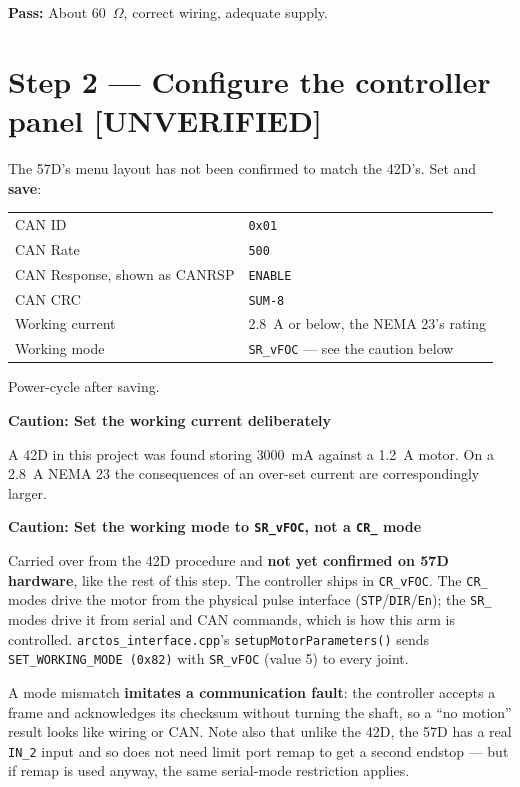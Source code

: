 \documentclass[11pt,letterpaper]{article}
\newenvironment{caution}[1]{%
    \par\addvspace{8pt}%
    \noindent{\color{cautionred}\rule{\linewidth}{0.8pt}}\par\vspace{2pt}
    \noindent\textbf{\color{cautionred}Caution: #1}\par\vspace{2pt}
}{%
    \par\vspace{2pt}\noindent{\color{cautionred}\rule{\linewidth}{0.4pt}}%
    \par\addvspace{8pt}%
}
\newcommand{\unverified}{{\color{unverifiedorange}\textbf{[UNVERIFIED]}}}
\newcommand{\passif}[1]{\par\vspace{2pt}\noindent\textbf{\color{okgreen}Pass:} #1\par\vspace{4pt}}
\begin{document}
\passif{About 60~$\Omega$, correct wiring, adequate supply.}

\section*{Step 2 --- Configure the controller panel \unverified}

The 57D's menu layout has not been confirmed to match the 42D's. Set and
\textbf{save}:

\begin{center}
\begin{tabular}{ll}
\toprule
CAN ID & \texttt{0x01} \\
CAN Rate & \texttt{500} \\
CAN Response, shown as CANRSP & \texttt{ENABLE} \\
CAN CRC & \texttt{SUM-8} \\
Working current & 2.8~A or below, the NEMA 23's rating \\
Working mode & \texttt{SR\_vFOC} --- see the caution below \\
\bottomrule
\end{tabular}
\end{center}

Power-cycle after saving.

\begin{caution}{Set the working current deliberately}
A 42D in this project was found storing 3000~mA against a 1.2~A motor. On a 2.8~A
NEMA 23 the consequences of an over-set current are correspondingly larger.
\end{caution}

\begin{caution}{Set the working mode to \texttt{SR\_vFOC}, not a \texttt{CR\_} mode}
Carried over from the 42D procedure and \textbf{not yet confirmed on 57D hardware}, like
the rest of this step. The controller ships in \texttt{CR\_vFOC}. The \texttt{CR\_} modes
drive the motor from the physical pulse interface (\texttt{STP}/\texttt{DIR}/\texttt{En});
the \texttt{SR\_} modes drive it from serial and CAN commands, which is how this arm is
controlled. \texttt{arctos\_interface.cpp}'s \texttt{setupMotorParameters()} sends
\texttt{SET\_WORKING\_MODE (0x82)} with \texttt{SR\_vFOC} (value 5) to every joint.

A mode mismatch \textbf{imitates a communication fault}: the controller accepts a frame and
acknowledges its checksum without turning the shaft, so a ``no motion'' result looks like
wiring or CAN. Note also that unlike the 42D, the 57D has a real \texttt{IN\_2} input and so
does not need limit port remap to get a second endstop --- but if remap is used anyway, the
same serial-mode restriction applies.
\end{caution}
\end{document}
